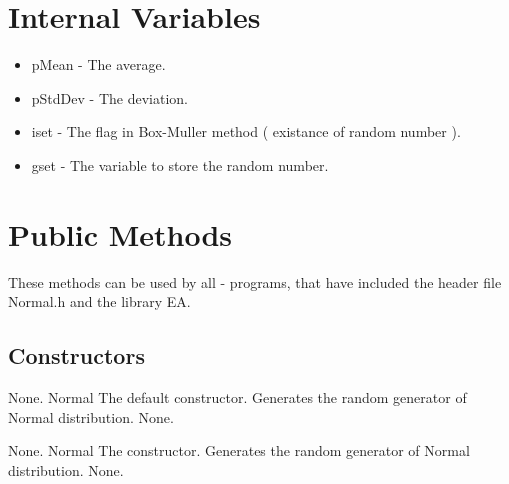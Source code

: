 \clearpage

\section{Internal Variables}

\begin{itemize}
\item pMean - The average.
\item pStdDev - The deviation.
\item iset - The flag in Box-Muller method ( existance of random
number ).
\item gset - The variable to store the random number.
\end{itemize}


\vspace*{10mm}

\section{Public Methods}

\noindent
These methods can be used by all \cpp - programs, that have included the
header file Normal.h and the library EA.

\subsection{Constructors}

\setNormalInstance
\setCorrectWidthThree{8pt}
\printMethodWithParamsSaved
{}
{None.}
{Normal}
{The default constructor. Generates the random generator of Normal distribution.}
{None.}
\setCorrectWidthThree{4pt}

\setNormalInstance
\setCorrectWidthThree{8pt}
\printMethodWithParamsSaved
{}
{None.}
{Normal}
{The constructor. Generates the random generator of Normal distribution.}
{None.}
\setCorrectWidthThree{4pt}

